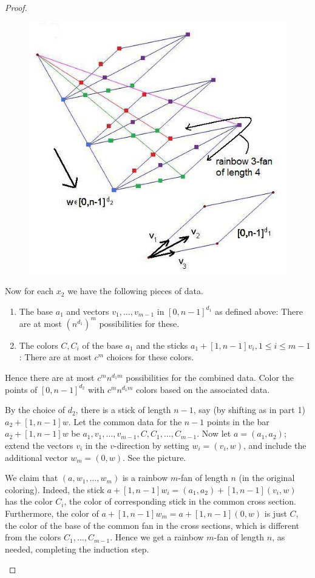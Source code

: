 \begin{proof}
\begin{enumerate}
\begin{figure}[h!]\centering
\includegraphics{cnt-chapters/hales-jewett}
\end{figure}

Now for each $x_2$ we have the following pieces of data.
\begin{enumerate}
\item
The base $a_1$ and vectors $v_1,\ldots, v_{m-1}$ in $[0,n-1]^{d_1}$ as defined above: There are at most $(n^{d_1})^m$ possibilities for these.
\item
The colors $C, C_i$ of the base $a_1$ and the sticks $a_1+[1,n-1]v_i,1\leq i\leq m-1$: There are at most $c^m$ choices for these colors.
\end{enumerate}
Hence there are at most $c^mn^{d_1m}$ possibilities for the combined data. Color the points of $[0,n-1]^{d_2}$ with $c^mn^{d_1m}$ colors based on the associated data. 

By the choice of $d_2$, there is a stick of length $n-1$, say (by shifting as in part 1) $a_2+[1,n-1]w$.  
Let the common data for the $n-1$ points in the bar $a_2+[1,n-1]w$ be $a_1,v_1,\ldots, v_{m-1}, C, C_1,\ldots, C_{m-1}$. Now let $a=(a_1,a_2)$; extend the vectors $v_i$ in the $v$-direction by setting $w_i=(v_i,w)$, and include the additional vector $w_m=(0,w)$. See the picture.

We claim that $(a,w_1,\ldots, w_m)$ is a rainbow $m$-fan of length $n$ (in the original coloring). Indeed, the stick $a+[1,n-1]w_i=(a_1,a_2)+[1,n-1](v_i,w)$ has the color $C_i$, the color of corresponding stick in the common cross section. Furthermore, the color of $a+[1,n-1]w_m=a+[1,n-1](0,w)$ is just $C$, the color of the base of the common fan in the cross sections, which is different from the colors $C_1,\ldots, C_{m-1}$. Hence we get a rainbow $m$-fan of length $n$, as needed, completing the induction step.
\end{enumerate}
\end{proof}
